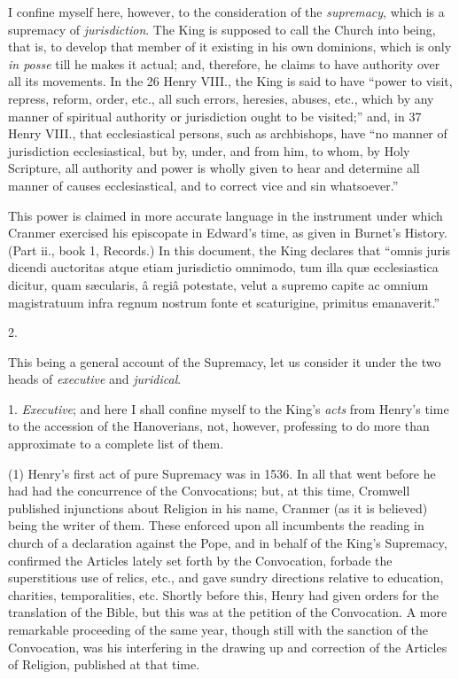 I confine myself here, however,
to the consideration of the \emph{supremacy}, which is a supremacy of \emph{jurisdiction}.
The King is supposed to call the Church into being, that is, to
develop that member of it existing in his own dominions, which is only
\emph{in posse} till he makes it actual; and, therefore, he claims to
have authority over all its movements. In the 26 Henry VIII., the King
is said to have ``power to visit, repress, reform, order, etc., all
such errors, heresies, abuses, etc., which by any manner of spiritual
authority or jurisdiction ought to be visited;'' and, in 37 Henry
VIII., that ecclesiastical persons, such as archbishops, have ``no
manner of jurisdiction ecclesiastical, but by, under, and from him, to
whom, by Holy Scripture, all authority and power is wholly given to
hear and determine all manner of causes ecclesiastical, and to
correct vice and sin whatsoever.''

This power is claimed in more
accurate language in the instrument under which Cranmer exercised his
episcopate in Edward's time, as given in Burnet's History. (Part ii.,
book 1, Records.) In this document, the King declares that ``omnis
juris dicendi auctoritas atque etiam jurisdictio omnimodo, tum illa quæ
ecclesiastica dicitur, quam sæcularis, â regiâ potestate, velut a
supremo capite ac omnium magistratuum infra regnum nostrum fonte et
scaturigine, primitus emanaverit.''

2.

This being a general account
of the Supremacy, let us consider it under the two heads of \emph{executive}
and \emph{juridical}.

1. \emph{Executive}; and here
I shall confine myself to the King's \emph{acts} from Henry's time to
the accession of the Hanoverians, not, however, professing to do more
than approximate to a complete list of them.

(1) Henry's first act of pure
Supremacy was in 1536. In all that went before he had had the
concurrence of the Convocations; but, at this time, Cromwell published
injunctions about Religion in his name, Cranmer (as it is believed)
being the writer of them. These enforced upon all incumbents the
reading in church of a declaration against the Pope, and in behalf of
the King's Supremacy, confirmed the Articles lately set forth by the
Convocation, forbade the superstitious use of relics, etc., and gave
sundry directions relative to education, charities, temporalities,
etc. Shortly before this, Henry had given orders for the translation
of the Bible, but this was at the petition of the Convocation. A more
remarkable proceeding of the same year, though still with the sanction
of the Convocation, was his interfering in the drawing up and
correction of the Articles of Religion, published at that time.

